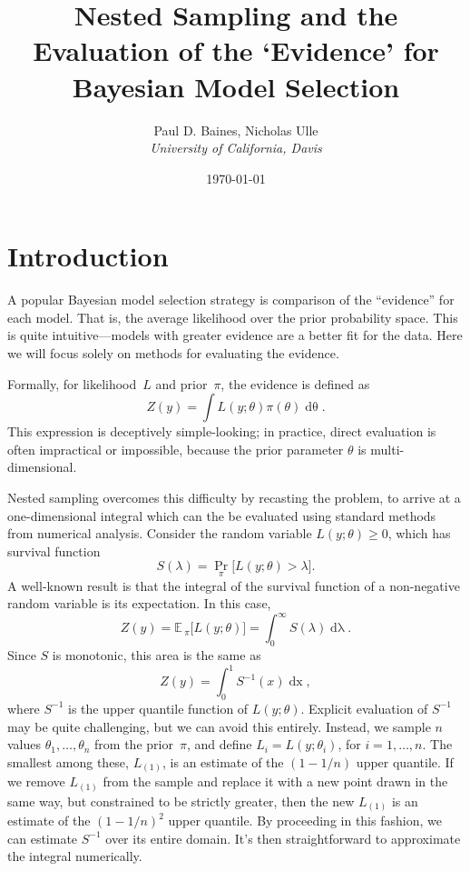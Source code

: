 \documentclass[11pt]{article}
\def\E{\mathbb{E}\,}
\newcommand{\df}[1]{ \mathop{\mathrm{d}#1} }
\begin{document}
\title{Nested Sampling and the Evaluation of the \lq{}Evidence\rq{} for Bayesian Model Selection}
\author{
Paul D. Baines, Nicholas Ulle\\
\emph{University of California, Davis}
}
\date{\today}
\maketitle

\section{Introduction}\label{overview}
A popular Bayesian model selection strategy is comparison of the 
``evidence'' for each model.
That is, the average likelihood over the prior probability space.
This is quite intuitive---models with greater evidence are a better fit for
the data.
Here we will focus solely on methods for evaluating the evidence.

Formally, for likelihood~$L$ and prior~$\pi$, the evidence is defined as
\[
    Z(y) = \int L(y; \theta) \pi(\theta) \df{\theta}.
\]
This expression is deceptively simple-looking;
in practice, direct evaluation is often impractical or impossible,
because the prior parameter $\theta$ is multi-dimensional.

Nested sampling overcomes this difficulty by recasting the problem,
to arrive at a one-dimensional integral which can the be evaluated using
standard methods from numerical analysis.
Consider the random variable $L(y; \theta) \geq 0$,
which has survival function
\[
    S(\lambda) = \Pr_\pi \bigl[ L(y; \theta) > \lambda \bigr].
\]
A well-known result is that the integral of the survival function of a
non-negative random variable is its expectation. In this case,
\[
    Z(y)
    =
    \E_\pi \bigl[ L(y; \theta) \bigr]
    =
    \int_0^\infty S(\lambda) \df{\lambda}.
\]
Since $S$ is monotonic, this area is the same as
\[
    Z(y)
    =
    \int_0^1 S^{-1}(x) \df{x},
\]
where $S^{-1}$ is the upper quantile function of $L(y; \theta)$.
Explicit evaluation of $S^{-1}$ may be quite challenging,
but we can avoid this entirely.
Instead, we sample $n$ values $\theta_1, \ldots, \theta_n$
from the prior~$\pi$, and define $L_i = L(y; \theta_i)$,
for $i = 1, \ldots, n$.
The smallest among these, $L_{(1)}$,
is an estimate of the $(1 - 1 / n)$ upper quantile.
If we remove $L_{(1)}$ from the sample and replace it with a new point
drawn in the same way, but constrained to be strictly greater,
then the new $L_{(1)}$ is an estimate of the $(1 - 1/n)^2$ upper quantile.
By proceeding in this fashion, we can estimate $S^{-1}$ over its entire
domain.
It's then straightforward to approximate the integral numerically.
\end{document}
